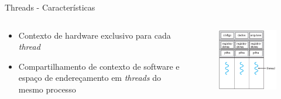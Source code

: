 \documentclass[aspectratio=169,
				xcolor=table]{beamer}
\begin{document}
	\begin{frame}{Threads - Características}
	
		\begin{columns}[t]
			\begin{column}{0.5\textwidth}			
				\begin{itemize}
					\item Contexto de hardware exclusivo para cada \textit{thread}
					\vspace{1em}
					\item Compartilhamento de contexto de software e espaço de endereçamento em \textit{threads} do mesmo processo					
				\end{itemize}
			\end{column}
			\begin{column}{0.5\textwidth}
			\begin{figure}[hbtp]
				\centering
				\includegraphics[width=.85\textwidth, keepaspectratio]{../figs/cap04/multithread.png}
			\end{figure}
			\end{column}
		\end{columns}
	\end{frame}
\end{document}
